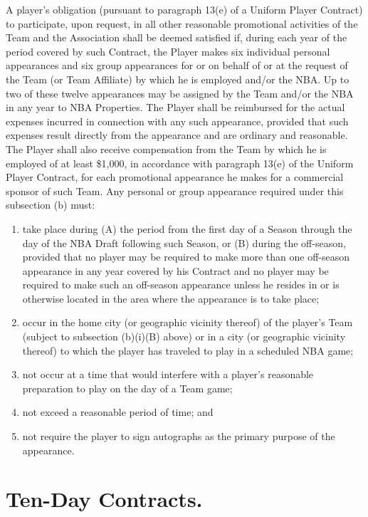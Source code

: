 \documentclass[
]{book}
\providecommand{\tightlist}{%
  \setlength{\itemsep}{0pt}\setlength{\parskip}{0pt}}
\begin{document}
\begin{enumerate}
  A player's obligation (pursuant to paragraph 13(e) of a Uniform Player Contract) to participate, upon request, in all other reasonable promotional activities of the Team and the Association shall be deemed satisfied if, during each year of the period covered by such Contract, the Player makes six individual personal appearances and six group appearances for or on behalf of or at the request of the Team (or Team Affiliate) by which he is employed and/or the NBA. Up to two of these twelve appearances may be assigned by the Team and/or the NBA in any year to NBA Properties. The Player shall be reimbursed for the actual expenses incurred in connection with any such appearance, provided that such expenses result directly from the appearance and are ordinary and reasonable. The Player shall also receive compensation from the Team by which he is employed of at least \$1,000, in accordance with paragraph 13(e) of the Uniform Player Contract, for each promotional appearance he makes for a commercial sponsor of such Team. Any personal or group appearance required under this subsection (b) must:

  \begin{enumerate}
  \def\labelenumii{(\roman{enumii})}
  \tightlist
  \item
    take place during (A) the period from the first day of a Season through the day of the NBA Draft following such Season, or (B) during the off-season, provided that no player may be required to make more than one off-season appearance in any year covered by his Contract and no player may be required to make such an off-season appearance unless he resides in or is otherwise located in the area where the appearance is to take place;
  \item
    occur in the home city (or geographic vicinity thereof) of the player's Team (subject to subsection (b)(i)(B) above) or in a city (or geographic vicinity thereof) to which the player has traveled to play in a scheduled NBA game;
  \item
    not occur at a time that would interfere with a player's reasonable preparation to play on the day of a Team game;
  \item
    not exceed a reasonable period of time; and
  \item
    not require the player to sign autographs as the primary purpose of the appearance.
  \end{enumerate}
\end{enumerate}

\hypertarget{ten-day-contracts.}{%
\section{Ten-Day Contracts.}\label{ten-day-contracts.}}
\end{document}
